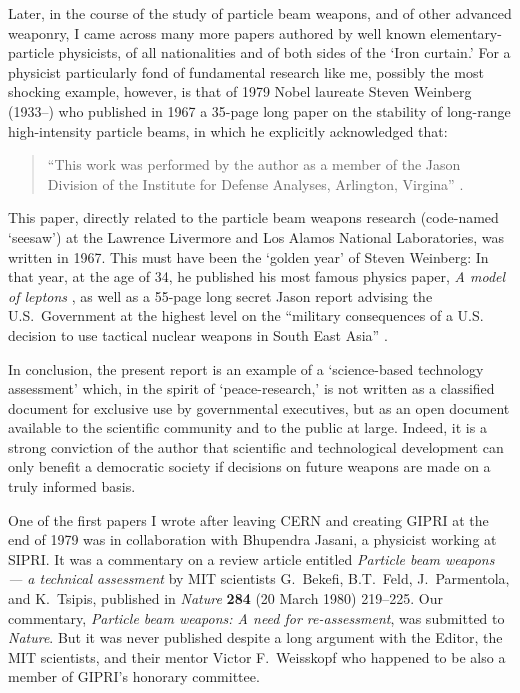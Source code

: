 \documentclass [12pt,a4paper,     ]{report} %
\begin{document}
Later, in the course of the study of particle beam weapons, and of other advanced weaponry, I came across many more papers authored by well known elementary-particle physicists, of all nationalities and of both sides of the `Iron curtain.'  For a physicist particularly fond of fundamental research like me, possibly the most shocking example, however, is that of 1979 Nobel laureate Steven Weinberg (1933--) who published in 1967 a 35-page long paper on the stability of long-range high-intensity particle beams, in which he explicitly acknowledged that:
%
\begin{quote}
``This work was performed by the author as a member of the Jason Division of the Institute for Defense Analyses, Arlington, Virgina'' \cite[p.\,635]{WEINB1967A}.
\end{quote}
%
This paper, directly related to the particle beam weapons research (code-named `seesaw') at the Lawrence Livermore and Los Alamos National Laboratories, was written in 1967.  This must have been the `golden year' of Steven Weinberg:  In that year, at the age of 34, he published his most famous physics paper, \emph{A model of leptons} \cite{WEINB1967B}, as well as a 55-page long secret Jason report advising the U.S.\ Government at the highest level on the ``military consequences of a U.S. decision to use tactical nuclear weapons in South East Asia'' \cite{DYSON1967-}.


    In conclusion, the present report is an example of a `science-based technology assessment' which, in the spirit of  `peace-research,' is not written as a classified document for exclusive use by governmental executives, but as an open document available to the scientific community and to the public at large.  Indeed, it is a strong conviction of the author that scientific and technological development can only benefit a democratic society if decisions on future weapons are made on a truly informed basis.




\newpage


\label{p-F}

\vspace{2\baselineskip}

\noindent One of the first papers I wrote after leaving CERN and creating GIPRI at the end of 1979 was in collaboration with Bhupendra Jasani, a physicist working at SIPRI.  It was a commentary on a review article entitled \emph{Particle beam weapons --- a technical assessment} by MIT scientists G.\ Bekefi, B.T.\ Feld, J.\ Parmentola, and K.\ Tsipis, published in \emph{Nature} {\bf 284} (20 March 1980) 219--225.  Our commentary, \emph{Particle beam weapons: A need for re-assessment}, was submitted to \emph{Nature}.  But it was never published despite a long argument with the Editor, the MIT scientists, and their mentor Victor F.\ Weisskopf who happened to be also a member of GIPRI's honorary committee.
\end{document}
